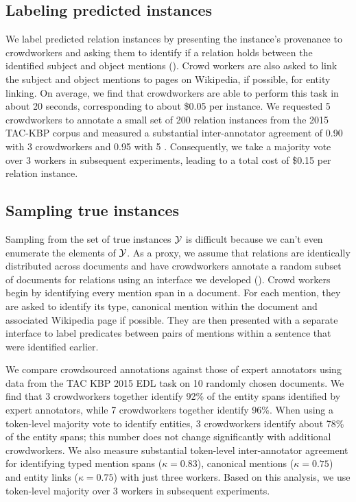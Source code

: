 \subsection{Labeling predicted instances}
We label predicted relation instances by presenting the instance's provenance to crowdworkers
  and asking them to identify if a relation holds between the identified subject and object mentions (). 
  Crowd workers are also asked to link the subject and object mentions  to pages on Wikipedia, if possible, for entity linking.
On average, we find that crowdworkers are able to perform this task in about 20 seconds, corresponding to about \$0.05 per instance.
We requested 5 crowdworkers to annotate a small set of 200 relation instances from the 2015 TAC-KBP corpus 
and measured a substantial inter-annotator agreement of 0.90 with 3 crowdworkers and 0.95 with 5 .
Consequently, we take a majority vote over 3 workers in subsequent experiments,
leading to a total cost of \$0.15 per relation instance.

\subsection{Sampling true instances}
Sampling from the set of true instances $\mathcal{Y}$ is difficult because we can't even enumerate the elements of $\mathcal{Y}$.
As a proxy, we assume that relations are identically distributed across documents and have crowdworkers annotate a random subset of documents for relations using an interface we developed ().
Crowd workers begin by identifying every mention span in a document.
  For each mention, they are asked to identify its type, canonical mention within the document
  and associated Wikipedia page if possible.
They are then presented with a separate interface to label predicates between pairs of mentions within a sentence that were identified earlier.

We compare crowdsourced annotations against those of expert annotators using data from the TAC KBP 2015 EDL task on 10 randomly chosen documents.
We find that 3 crowdworkers together identify 92\% of the entity spans identified by expert annotators, while 7 crowdworkers together identify 96\%.
When using a token-level majority vote to identify entities, 3 crowdworkers identify about 78\% of the entity spans; this number does not change significantly with additional crowdworkers.
We also measure substantial token-level inter-annotator agreement for identifying typed mention spans ($\kappa = 0.83$), canonical mentions ($\kappa = 0.75$) and entity links ($\kappa = 0.75$) with just three workers.
Based on this analysis, we use token-level majority over 3 workers in subsequent experiments.

